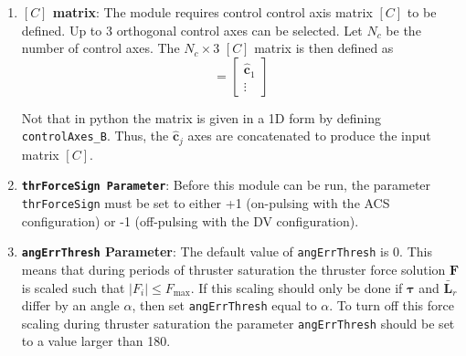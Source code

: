 \begin{enumerate}
\item \textbf{$[C]$ matrix}: The module requires control control axis matrix $[C]$ to be defined.  Up to 3 orthogonal control axes can be selected.  Let $N_{c}$ be the number of control axes.  The $N_{c}\times 3$ $[C]$ matrix is then defined as
\begin{equation}
	[C] = \begin{bmatrix}
		\hat{\bm c}_{1}
		\\
		\vdots
	\end{bmatrix}
\end{equation}

Not that in python the matrix is given in a 1D form by defining {\tt controlAxes\_B}.  Thus, the $\hat{\bm c}_{j}$ axes are concatenated to produce the input matrix $[C]$. 

\item \textbf{\tt thrForceSign Parameter}: Before this module can be run, the parameter {\tt thrForceSign} must be set to either +1 (on-pulsing with the ACS configuration) or -1 (off-pulsing with the DV configuration).

\item \textbf{{\tt angErrThresh} Parameter}: The default value of {\tt angErrThresh} is 0\dg.  This means that during periods of thruster saturation the thruster force solution $\bm F$ is scaled such that $|F_{i}| \le F_{\text{max}}$.  If this scaling should only be done if $\bm\tau$ and $\bar{\bm L}_{r}$ differ by an angle $\alpha$, then set {\tt angErrThresh} equal to $\alpha$.  To turn off this force scaling during thruster saturation the parameter   {\tt angErrThresh} should be set to a value larger than 180\dg.  

\end{enumerate}
